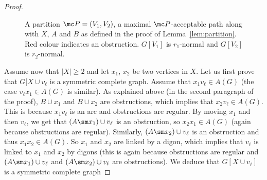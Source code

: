 \begin{proof}
\begin{figure}[ht]
    

    \caption{A partition $\mc P = (V_1, V_2)$, a maximal $\mc P$-acceptable path along with $X$, $A$ and $B$ as defined in the proof of Lemma~\ref{lem:partition}. Red colour indicates an obstruction. $G[V_1]$ is $r_1$-normal and $G[V_2]$ is $r_2$-normal.} 
    \label{fig:my_label}
\end{figure}


Assume now that $|X| \geq 2$ and let $x_1$, $x_2$ be two vertices in $X$. 
Let us first prove that $G[X \cup v_{\ell}$ is a symmetric complete graph. 
Assume that $x_1v_{\ell} \in A(G)$ (the case $v_{\ell}x_1 \in A(G)$ is similar).
As explained above (in the second paragraph of the proof), $B \cup x_1$ and $B \cup x_2$ are obstructions, which implies that $x_2v_{\ell} \in A(G)$. This is because $x_1v_{\ell}$ is an arc and obstructions are regular. 
By moving $x_1$ and then $v_{\ell}$, we get that $(A \sm x_1) \cup v_{\ell}$ is an obstruction, so $x_2x_1 \in A(G)$ (again because obstructions are regular). 
Similarly, $(A \sm x_2) \cup v_{\ell}$ is an obstruction and thus $x_1x_2 \in A(G)$. So $x_1$ and $x_2$ are linked by a digon, which implies that $v_{\ell}$ is linked to $x_1$ and $x_2$ by digons (this is again because obstructions are regular and $(A \sm x_1) \cup v_{\ell}$ and $(A \sm x_2) \cup v_{\ell}$ are obstructions).  
We deduce that $G[X \cup v_{\ell}]$ is a symmetric complete graph  


\end{proof}
